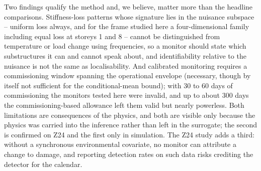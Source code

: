 \documentclass[12pt,a4paper]{article}
\newcommand{\rev}[1]{#1}
\newcommand{\rev}[1]{{\color{revcol}#1}}
\newcommand{\rtwo}[1]{#1}
\newcommand{\rtwo}[1]{{\color{revcolb}#1}}
\begin{document}
Two findings qualify the method and, we believe, matter more than the headline comparisons. \rtwo{\rtwo{Stiffness-loss patterns whose signature lies in the nuisance subspace -- uniform loss always, and for the frame studied here a four-dimensional family including equal loss at storeys 1 and 8 -- cannot be distinguished from temperature or load change using frequencies,} so a monitor should state which substructures it can and cannot speak about, \rtwo{and identifiability relative to the nuisance is not the same as localisability.} And calibrated monitoring requires a commissioning window spanning the operational envelope (necessary, though by itself not sufficient for the conditional-mean bound); with 30 to 60 days of commissioning the monitors tested here were invalid, and up to about 300 days the commissioning-based allowance left them valid but nearly powerless.} Both limitations are consequences of the physics, and both are visible only because the physics was carried into the inference rather than left in the surrogate; \rev{the second is confirmed on Z24 and the first only in simulation.} The Z24 study adds a third: without a synchronous environmental covariate, no monitor can attribute a change to damage, and reporting detection rates on such data risks crediting the detector for the calendar.

\newpage


\newpage
\appendix
\renewcommand{\thesection}{\Alph{section}}
\setcounter{section}{0}
\end{document}
